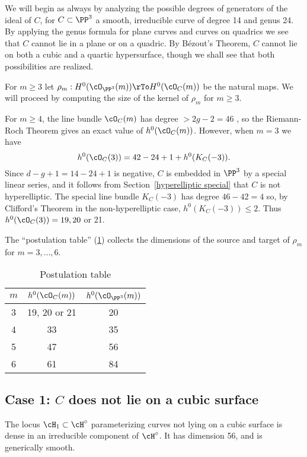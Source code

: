 We will begin as always by analyzing the possible degrees of generators of the ideal of $C$, for $C \subset \PP^3$ a smooth, irreducible curve of degree 14 and genus 24. By applying the genus formula for plane curves and curves on quadrics we see that $C$ cannot lie in a plane or on a quadric. By B\'ezout's Theorem, $C$ cannot lie on both a cubic and a quartic hypersurface, though we shall see that both possibilities are realized.

For $m\geq 3$ let
$
\rho_m : H^0(\cO_{\PP^3}(m)) \rTo H^0(\cO_C(m))
$
be the natural maps.
We will proceed by computing the size of the kernel of $\rho_m$ for $m\geq 3$.

For $m \geq 4$, the line bundle $\cO_C(m)$ has degree $>2g-2 = 46$ , so the Riemann-Roch Theorem gives an exact value of $h^0(\cO_C(m))$.
However, when $m= 3$ we have 
$$
h^0(\cO_C(3)) = 42-24+1+h^0(K_C(-3)).
$$
Since $d-g+1 = 14-24+1$ is negative, $C$ is embedded in $\PP^3$ by a special linear series, and it follows from Section~\ref{hyperelliptic special} that $C$ is not hyperelliptic. The special line bundle $K_C(-3)$ has degree $46-42 = 4$ so,
by Clifford's Theorem in the non-hyperelliptic case, $h^0(K_C(-3)) \leq 2$. Thus $h^0(\cO_C(3)) = 19, 20$ or 21.

 The ``postulation table'' (\ref{postulation table})
collects the dimensions of the source and target of  $\rho_m$ for $m = 3, \dots, 6$. 
\begin{table}\label{postulation table}
\begin{center}\begin{tabular}{ c | c | c }
 $m$ & $h^0(\cO_C(m))$ & $h^0(\cO_{\PP^3}(m))$ \\
 \hline
 3 & 19, 20 or 21 & 20 \\
 4 & 33 & 35 \\
 5 & 47 & 56 \\
 6 & 61 & 84
\end{tabular}
\end{center}
\caption{Postulation table\label{postulation table}}
\end{table}

\subsection{Case 1: $C$ does not lie on a cubic surface}

\begin{proposition}\label{mumford example H1}
The locus $\cH_1 \subset \cH^\circ$ parameterizing curves not lying on a cubic surface is dense in an irreducible component of  $\cH^\circ$. It has dimension 56, and is generically smooth.
\end{proposition} 
 
